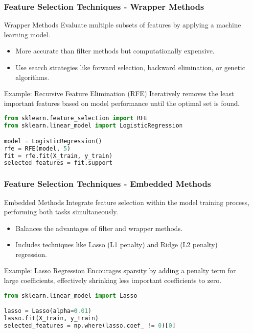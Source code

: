 \documentclass[aspectratio=169]{beamer}
\begin{document}
\begin{frame}[fragile]
    \frametitle{Feature Selection Techniques - Wrapper Methods}
    \begin{block}{Wrapper Methods}
        Evaluate multiple subsets of features by applying a machine learning model.
    \end{block}
    \begin{itemize}
        \item More accurate than filter methods but computationally expensive.
        \item Use search strategies like forward selection, backward elimination, or genetic algorithms.
    \end{itemize}
    \begin{block}{Example: Recursive Feature Elimination (RFE)}
        Iteratively removes the least important features based on model performance until the optimal set is found.
    \end{block}
    \begin{lstlisting}[language=Python]
from sklearn.feature_selection import RFE
from sklearn.linear_model import LogisticRegression

model = LogisticRegression()
rfe = RFE(model, 5)
fit = rfe.fit(X_train, y_train)
selected_features = fit.support_
    \end{lstlisting}
\end{frame}

\begin{frame}[fragile]
    \frametitle{Feature Selection Techniques - Embedded Methods}
    \begin{block}{Embedded Methods}
        Integrate feature selection within the model training process, performing both tasks simultaneously.
    \end{block}
    \begin{itemize}
        \item Balances the advantages of filter and wrapper methods.
        \item Includes techniques like Lasso (L1 penalty) and Ridge (L2 penalty) regression.
    \end{itemize}
    \begin{block}{Example: Lasso Regression}
        Encourages sparsity by adding a penalty term for large coefficients, effectively shrinking less important coefficients to zero.
    \end{block}
    \begin{lstlisting}[language=Python]
from sklearn.linear_model import Lasso

lasso = Lasso(alpha=0.01)
lasso.fit(X_train, y_train)
selected_features = np.where(lasso.coef_ != 0)[0]
    \end{lstlisting}
\end{frame}
\end{document}
